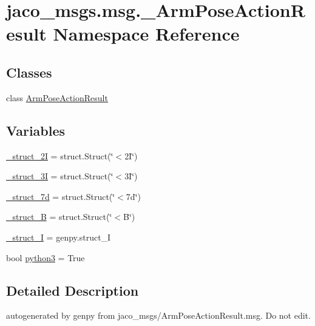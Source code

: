 \hypertarget{namespacejaco__msgs_1_1msg_1_1__ArmPoseActionResult}{}\section{jaco\+\_\+msgs.\+msg.\+\_\+\+Arm\+Pose\+Action\+Result Namespace Reference}
\label{namespacejaco__msgs_1_1msg_1_1__ArmPoseActionResult}
\subsection*{Classes}
\begin{DoxyCompactItemize}
\item 
class \hyperlink{classjaco__msgs_1_1msg_1_1__ArmPoseActionResult_1_1ArmPoseActionResult}{Arm\+Pose\+Action\+Result}
\end{DoxyCompactItemize}
\subsection*{Variables}
\begin{DoxyCompactItemize}
\item 
\hyperlink{namespacejaco__msgs_1_1msg_1_1__ArmPoseActionResult_a343ba631f51ac025a5692c871c907355}{\+\_\+struct\+\_\+2I} = struct.\+Struct(\char`\"{}$<$2\+I\char`\"{})
\item 
\hyperlink{namespacejaco__msgs_1_1msg_1_1__ArmPoseActionResult_a7079978f91756560eaacb6189b5e85f7}{\+\_\+struct\+\_\+3I} = struct.\+Struct(\char`\"{}$<$3\+I\char`\"{})
\item 
\hyperlink{namespacejaco__msgs_1_1msg_1_1__ArmPoseActionResult_ad8423a236d08d198987eb7b140713235}{\+\_\+struct\+\_\+7d} = struct.\+Struct(\char`\"{}$<$7d\char`\"{})
\item 
\hyperlink{namespacejaco__msgs_1_1msg_1_1__ArmPoseActionResult_aa0bd3b6f15ea2e77317e862761336933}{\+\_\+struct\+\_\+B} = struct.\+Struct(\char`\"{}$<$B\char`\"{})
\item 
\hyperlink{namespacejaco__msgs_1_1msg_1_1__ArmPoseActionResult_a9bac87ee3228b57bed84b7640510057b}{\+\_\+struct\+\_\+I} = genpy.\+struct\+\_\+I
\item 
bool \hyperlink{namespacejaco__msgs_1_1msg_1_1__ArmPoseActionResult_ab813f43c34cb578abbc452f15ce8d117}{python3} = True
\end{DoxyCompactItemize}


\subsection{Detailed Description}
\begin{DoxyVerb}autogenerated by genpy from jaco_msgs/ArmPoseActionResult.msg. Do not edit.\end{DoxyVerb}
 

